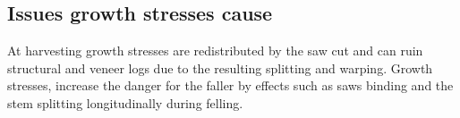 \subsection{Issues growth stresses cause }

At harvesting growth stresses are redistributed by the saw cut
and can ruin structural and veneer logs due to the resulting splitting and
warping. Growth stresses, increase the
danger for the faller by effects such as saws binding and the stem splitting longitudinally during felling.